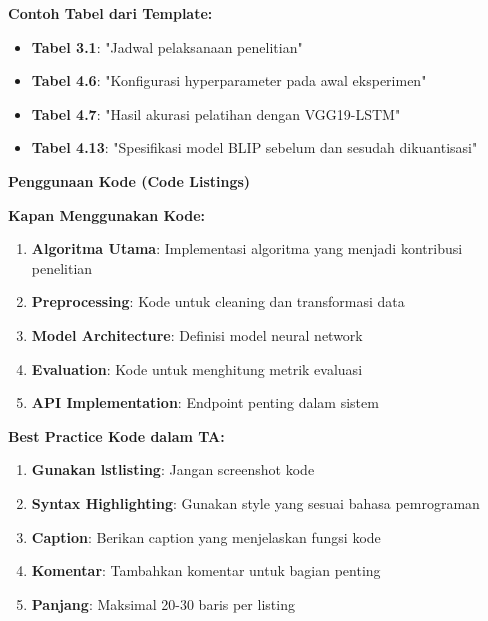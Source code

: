 \textbf{Contoh Tabel dari Template:}
\begin{itemize}
    \item \textbf{Tabel 3.1}: "Jadwal pelaksanaan penelitian"
    \item \textbf{Tabel 4.6}: "Konfigurasi hyperparameter pada awal eksperimen"
    \item \textbf{Tabel 4.7}: "Hasil akurasi pelatihan dengan VGG19-LSTM"
    \item \textbf{Tabel 4.13}: "Spesifikasi model BLIP sebelum dan sesudah dikuantisasi"
\end{itemize}

\textbf{Penggunaan Kode (Code Listings)}

\textbf{Kapan Menggunakan Kode:}
\begin{enumerate}
    \item \textbf{Algoritma Utama}: Implementasi algoritma yang menjadi kontribusi penelitian
    \item \textbf{Preprocessing}: Kode untuk cleaning dan transformasi data
    \item \textbf{Model Architecture}: Definisi model neural network
    \item \textbf{Evaluation}: Kode untuk menghitung metrik evaluasi
    \item \textbf{API Implementation}: Endpoint penting dalam sistem
\end{enumerate}

\textbf{Best Practice Kode dalam TA:}
\begin{enumerate}
    \item \textbf{Gunakan lstlisting}: Jangan screenshot kode
    \item \textbf{Syntax Highlighting}: Gunakan style yang sesuai bahasa pemrograman
    \item \textbf{Caption}: Berikan caption yang menjelaskan fungsi kode
    \item \textbf{Komentar}: Tambahkan komentar untuk bagian penting
    \item \textbf{Panjang}: Maksimal 20-30 baris per listing
\end{enumerate}

